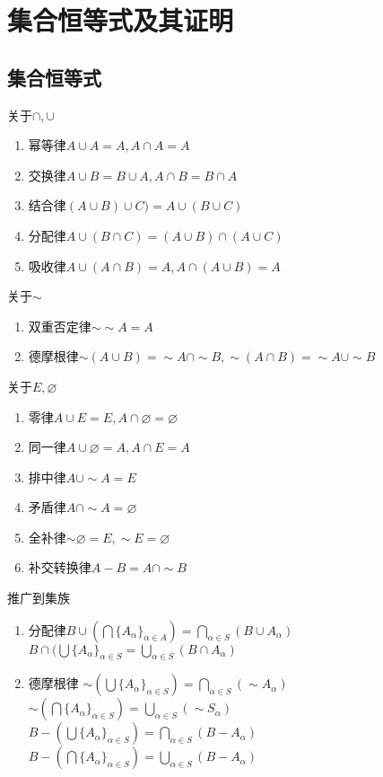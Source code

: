 \documentclass{book}
\newcommand{\no}{\varnothing}
\begin{document}
\chapter{集合恒等式及其证明}
\section{集合恒等式}
\noindent
关于$\cap, \cup$
\begin{enumerate}
    \item 幂等律\quad $A\cup A=A, A\cap A=A$
    \item 交换律\quad $A\cup B=B\cup A, A\cap B=B\cap A$
    \item 结合律\quad $(A\cup B)\cup C)=A\cup (B\cup C)$
    \item 分配律\quad $A\cup (B\cap C)=(A\cup B)\cap (A\cup C)$ 
    \item 吸收律\quad $A\cup (A\cap B)=A, A\cap (A\cup B)=A$
\end{enumerate}
关于$\sim$
\begin{enumerate}
    \item 双重否定律\quad $\sim\sim A=A$
    \item 德摩根律\quad $\sim (A\cup B)=\sim A\cap \sim B, \sim (A\cap B)=\sim A\cup \sim B$
\end{enumerate}
关于$E, \no$
\begin{enumerate}
    \item 零律\quad $A\cup E=E, A\cap\no=\no$
    \item 同一律\quad $A\cup\no=A, A\cap E=A$
    \item 排中律\quad $A\cup\sim A=E$
    \item 矛盾律\quad $A\cap\sim A=\no$
    \item 全补律\quad $\sim\no=E,\sim E=\no$
    \item 补交转换律\quad $A-B=A\cap\sim B$
\end{enumerate}
推广到集族
\begin{enumerate}
    \item 分配律\quad $B\cup (\bigcap\{A_\alpha\}_{\alpha\in A})=\bigcap_{\alpha\in S}(B\cup A_\alpha)$\\
        $B\cap (\bigcup\{A_\alpha\}_{\alpha\in S}=\bigcup_{\alpha\in S}(B\cap A_\alpha)$
     \item 德摩根律 $\sim (\bigcup\{A_\alpha\}_{\alpha\in S})=\bigcap_{\alpha\in S}(\sim A_\alpha)$\\
        $\sim (\bigcap\{A_\alpha\}_{\alpha\in S})=\bigcup_{\alpha\in S}(\sim S_\alpha)$\\
        $B-(\bigcup\{A_\alpha\}_{\alpha\in S})=\bigcap_{\alpha\in S}(B-A_\alpha)$\\
        $B-(\bigcap\{A_\alpha\}_{\alpha\in S})=\bigcup_{\alpha\in S}(B-A_\alpha)$
\end{enumerate}
\end{document}
